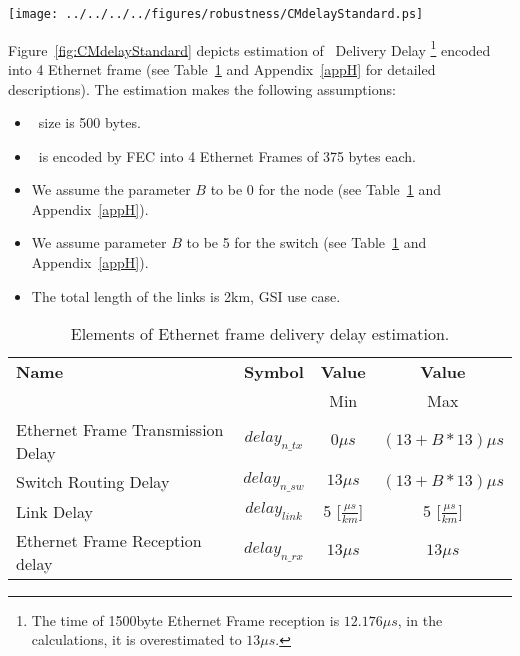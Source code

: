 \begin{center}
	\texttt{[image: ../../../../figures/robustness/CMdelayStandard.ps]}
	\label{fig:CMdelayStandard}
\end{center}

Figure~\ref{fig:CMdelayStandard} depicts estimation of \ControlMessage\ Delivery
Delay \footnote{The time of 1500byte Ethernet Frame reception is $12.176\mu s$,
in the calculations, it is overestimated to $13\mu s$.}   encoded into 4
Ethernet frame (see Table~\ref{tab:EtherFrameDelayGeneral} and 
Appendix~\ref{appH} for detailed descriptions). The estimation makes the
following assumptions:
\begin{itemize}
  \item \ControlMessage\ size is 500 bytes.
  \item \ControlMessage\ is encoded by FEC into 4 Ethernet Frames of 375 bytes
each.
  \item We assume the parameter $B$ to be 0 for the node (see
Table~\ref{tab:EtherFrameDelayGeneral} and Appendix~\ref{appH}).
  \item We assume parameter $B$ to be 5 for the switch (see
Table~\ref{tab:EtherFrameDelayGeneral} and Appendix~\ref{appH}).
  \item The total length of the links is 2km, GSI use case.
\end{itemize}

\begin{table}[ht]
\caption{Elements of Ethernet frame delivery delay estimation.} 
\centering
	\begin{tabular}{| l |  c | c | c |}          \hline
\textbf{Name}&\textbf{Symbol}&\textbf{Value}&\textbf{Value}                  \\
                                 &                &  Min& Max          \\ \hline
Ethernet Frame Transmission Delay&$delay_{n\_tx}$&$0\mu s$&$(13 + B * 13)\mu s$
\\ \hline
Switch Routing Delay &$delay_{n\_sw}$&$13\mu s$ &$(13 + B * 13)\mu s$ 
 
\\ \hline
Link Delay                       & $delay_{link}$ &5 [$\frac{\mu
s}{km}$]&5 [$\frac{\mu s}{km}$]      
\\ \hline
Ethernet Frame Reception delay   & $delay_{n\_rx}$&$13\mu s$&$13\mu s$

\\ \hline
\end{tabular}
\label{tab:EtherFrameDelayGeneral}
\end{table}


